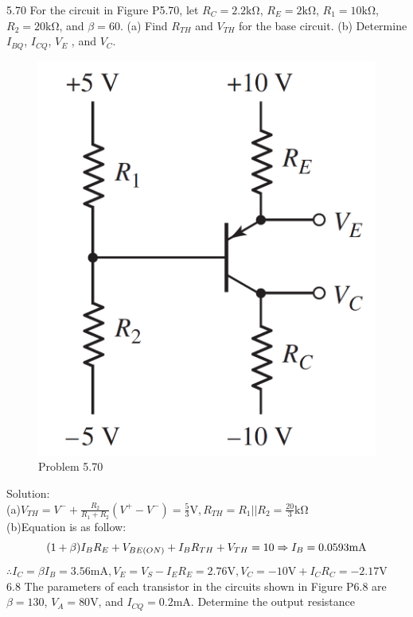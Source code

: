 \documentclass[a4paper,11pt,UTF8]{article}
\begin{document}
5.70 For the circuit in Figure P5.70, let $R_C = 2.2 \mathrm{k\Omega}$, $R_E = 2 \mathrm{k\Omega}$, $R_1 = 10 \mathrm{k\Omega}$,
$R_2 = 20 \mathrm{k\Omega}$, and $\beta = 60$. (a) Find $R_{T H}$ and $V_{T H}$ for the base circuit.
(b) Determine $I_{BQ}$, $I_{CQ}$, $V_E$ , and $V_C$.\\
\begin{figure}[H] 
	\centering 
	\includegraphics[scale=0.15]{MD5.70.png}
	\caption{Problem 5.70}
\end{figure}
\noindent Solution:\\
(a)$\displaystyle V_{TH}=V^-+\frac{R_2}{R_1+R_2}(V^+-V^-)=\frac{5}3\mathrm{V},R_{TH}=R_1||R_2=\frac{20}{3}\mathrm{k\Omega}$\\
(b)Equation is as follow:
$$
(1+\beta)I_BR_E+V_{BE(ON)}+I_BR_{TH}+V_{TH}=10\\
\Rightarrow I_B=0.0593 \mathrm{mA}
$$
$\therefore I_C=\beta I_B=3.56 \mathrm{mA},V_E=V_S-I_ER_E=2.76 \mathrm{V},V_C=-10\mathrm{V}+I_CR_C=-2.17\mathrm{V}$\\
6.8 The parameters of each transistor in the circuits shown in Figure P6.8 are
$\beta = 130$, $V_A = 80 $V, and $I_{CQ} = 0.2 $mA. Determine the output resistance
\end{document}

